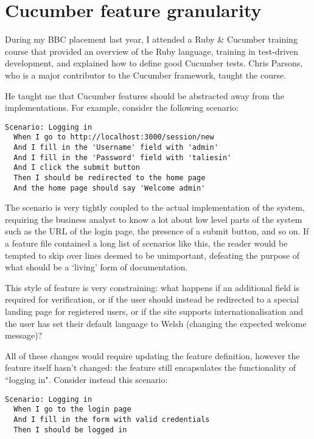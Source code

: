 \chapter{Cucumber feature granularity}
\label{appendix:cucumber}

During my BBC placement last year, I attended a Ruby \& Cucumber training course that provided an overview of the Ruby language, training in test-driven development, and explained how to define good Cucumber tests.  Chris Parsons, who is a major contributor to the Cucumber framework, taught the course.

He taught me that Cucumber features should be abstracted away from the implementations. For example, consider the following scenario:

\begin{lstlisting}
Scenario: Logging in
  When I go to http://localhost:3000/session/new
  And I fill in the 'Username' field with 'admin'
  And I fill in the 'Password' field with 'taliesin'
  And I click the submit button
  Then I should be redirected to the home page
  And the home page should say 'Welcome admin'
\end{lstlisting}

The scenario is very tightly coupled to the actual implementation of the system, requiring the business analyst to know a lot about low level parts of the system such as the URL of the login page, the presence of a submit button, and so on. If a feature file contained a long list of scenarios like this, the reader would be tempted to skip over lines deemed to be unimportant, defeating the purpose of what should be a `living' form of documentation.~\cite{appendix:cucumber:livingDocumentation}

This style of feature is very constraining: what happens if an additional field is required for verification, or if the user should instead be redirected to a special landing page for registered users, or if the site supports internationalisation and the user has set their default language to Welsh (changing the expected welcome message)?

All of these changes would require updating the feature definition, however the feature itself hasn't changed: the feature still encapsulates the functionality of ``logging in". Consider instead this scenario:

\begin{lstlisting}
Scenario: Logging in
  When I go to the login page
  And I fill in the form with valid credentials
  Then I should be logged in
 \end{lstlisting}

